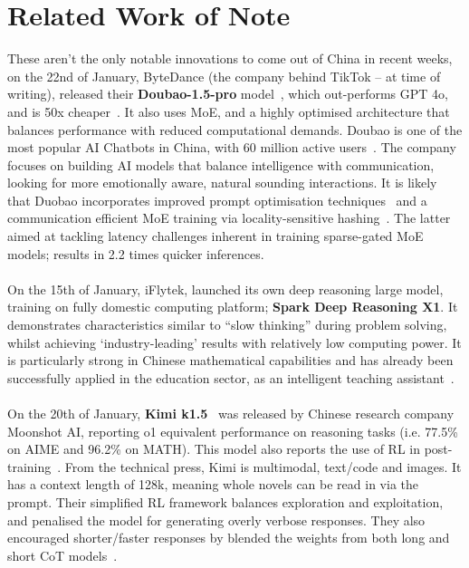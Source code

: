 \section{Related Work of Note}
These aren’t the only notable innovations to come out of China in recent weeks, on the 22nd of January, ByteDance (the company behind TikTok – at time of writing), released their \textbf{Doubao-1.5-pro} model~\cite{Doubao2025}, which out-performs GPT 4o, and is 50x cheaper~\cite{Razzaq2025}.  It also uses MoE, and a highly optimised architecture that balances performance with reduced computational demands.  Doubao is one of the most popular AI Chatbots in China, with 60 million active users~\cite{ZenSoo2025}.  The company focuses on building AI models that balance intelligence with communication, looking for more emotionally aware, natural sounding interactions. It is likely that Duobao incorporates improved prompt optimisation techniques~\cite{Yan2024} and a communication efficient MoE training via locality-sensitive hashing~\cite{Nie2024}.  The latter aimed at tackling latency challenges inherent in training sparse-gated MoE models; results in 2.2 times quicker inferences.

\paragraph{}On the 15th of January, iFlytek, launched its own deep reasoning large model, training on fully domestic computing platform; \textbf{Spark Deep Reasoning X1}.  It demonstrates characteristics similar to “slow thinking” during problem solving, whilst achieving ‘industry-leading’ results with relatively low computing power.  It is particularly strong in Chinese mathematical capabilities and has already been successfully applied in the education sector, as an intelligent teaching assistant~\cite{AIbase2025}.

\paragraph{}On the 20th of January, \textbf{Kimi k1.5}~\cite{Kimi2025} was released by Chinese research company Moonshot AI, reporting o1 equivalent performance on reasoning tasks (i.e. 77.5\% on AIME and 96.2\% on MATH).  This model also reports the use of RL in post-training~\cite{KimiTeam2025}.  From the technical press, Kimi is multimodal, text/code and images.  It has a context length of 128k, meaning whole novels can be read in via the prompt.  Their simplified RL framework balances exploration and exploitation, and penalised the model for generating overly verbose responses.  They also encouraged shorter/faster responses by blended the weights from both long and short CoT models~\cite{Ashley2025}.  


